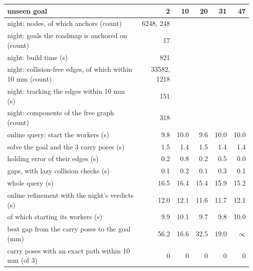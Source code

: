 \begin{tabular}{@{}>{\raggedright\arraybackslash}p{6.4cm} rrrrr@{}}
\toprule
unseen goal & 2 & 10 & 20 & 31 & 47 \\
\midrule
night: nodes, of which anchors (count) & 6248, 248 &  &  &  &  \\
night: goals the roadmap is anchored on (count) & 17 &  &  &  &  \\
night: build time (s) & 821 &  &  &  &  \\
night: collision-free edges, of which within 10 mm (count) & 33582, 1218 &  &  &  &  \\
night: tracking the edges within 10 mm (s) & 151 &  &  &  &  \\
night: components of the free graph (count) & 318 &  &  &  &  \\
\midrule
online query: start the workers (s) & 9.8 & 10.0 & 9.6 & 10.0 & 10.0 \\
\quad solve the goal and the 3 carry poses (s) & 1.5 & 1.4 & 1.5 & 1.4 & 1.4 \\
\quad holding error of their edges (s) & 0.2 & 0.8 & 0.2 & 0.5 & 0.0 \\
\quad gaps, with lazy collision checks (s) & 0.1 & 0.2 & 0.1 & 0.3 & 0.1 \\
\quad whole query (s) & 16.5 & 16.4 & 15.4 & 15.9 & 15.2 \\
online refinement with the night's verdicts (s) & 12.0 & 12.1 & 11.6 & 11.7 & 12.1 \\
\quad of which starting its workers (s) & 9.9 & 10.1 & 9.7 & 9.8 & 10.0 \\
\midrule
best gap from the carry poses to the goal (mm) & 56.2 & 16.6 & 32.5 & 19.0 & $\infty$ \\
carry poses with an exact path within 10 mm (of 3) & 0 & 0 & 0 & 0 & 0 \\
\bottomrule
\end{tabular}
